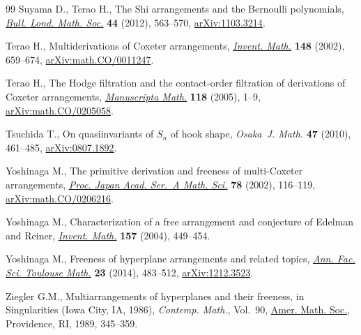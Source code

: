 \documentclass[pdftex]{sigma}
\numberwithin{equation}{section}
\begin{document}
\begin{thebibliography}{99}
Suyama D., Terao H., The {S}hi arrangements and the {B}ernoulli polynomials,
 \href{https://doi.org/10.1112/blms/bdr118}{\textit{Bull. Lond. Math. Soc.}} \textbf{44} (2012), 563--570,
 \href{https://arxiv.org/abs/1103.3214}{arXiv:1103.3214}.

Terao H., Multiderivations of {C}oxeter arrangements, \href{https://doi.org/10.1007/s002220100209}{\textit{Invent. Math.}}
 \textbf{148} (2002), 659--674, \href{https://arxiv.org/abs/math.CO/0011247}{arXiv:math.CO/0011247}.

Terao H., The {H}odge filtration and the contact-order filtration of
 derivations of {C}oxeter arrangements, \href{https://doi.org/10.1007/s00229-004-0536-z}{\textit{Manuscripta Math.}}
 \textbf{118} (2005), 1--9, \href{https://arxiv.org/abs/math.CO/0205058}{arXiv:math.CO/0205058}.

Tsuchida T., On quasiinvariants of {$S_n$} of hook shape, \textit{Osaka~J.
 Math.} \textbf{47} (2010), 461--485, \href{https://arxiv.org/abs/0807.1892}{arXiv:0807.1892}.

Yoshinaga M., The primitive derivation and freeness of multi-{C}oxeter
 arrangements, \href{https://doi.org/10.3792/pjaa.78.116}{\textit{Proc. Japan Acad. Ser.~A Math. Sci.}} \textbf{78}
 (2002), 116--119, \href{https://arxiv.org/abs/math.CO/0206216}{arXiv:math.CO/0206216}.

Yoshinaga M., Characterization of a free arrangement and conjecture of
 {E}delman and {R}einer, \href{https://doi.org/10.1007/s00222-004-0359-2}{\textit{Invent. Math.}} \textbf{157} (2004), 449--454.

Yoshinaga M., Freeness of hyperplane arrangements and related topics,
 \href{https://doi.org/10.5802/afst.1413}{\textit{Ann. Fac. Sci. Toulouse Math.}} \textbf{23} (2014), 483--512,
 \href{https://arxiv.org/abs/1212.3523}{arXiv:1212.3523}.

Ziegler G.M., Multiarrangements of hyperplanes and their freeness, in
 Singularities ({I}owa {C}ity, {IA}, 1986), \textit{Contemp. Math.}, Vol.~90,
 \href{https://doi.org/10.1090/conm/090/1000610}{Amer. Math. Soc.}, Providence, RI, 1989, 345--359.

\end{thebibliography}\LastPageEnding
\end{document}
